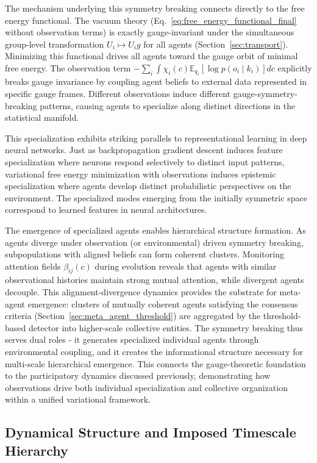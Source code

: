 \documentclass[11pt]{article}
\begin{document}
The mechanism underlying this symmetry breaking connects directly to the free energy functional. The vacuum theory (Eq.~\ref{eq:free_energy_functional_final} without observation terms) is exactly gauge-invariant under the simultaneous group-level transformation $U_i \mapsto U_i g$ for all agents (Section~\ref{sec:transport}). Minimizing this functional drives all agents toward the gauge orbit of minimal free energy. The observation term $-\sum_i \int \chi_i(c) \mathbb{E}_{q_i}[\log p(o_i \mid k_i)]  dc$ explicitly breaks gauge invariance by coupling agent beliefs to external data represented in specific gauge frames. Different observations induce different gauge-symmetry-breaking patterns, causing agents to specialize along distinct directions in the statistical manifold.

This specialization exhibits striking parallels to representational learning in deep neural networks. Just as backpropagation gradient descent induces feature specialization where neurons respond selectively to distinct input patterns, variational free energy minimization with observations induces epistemic specialization where agents develop distinct probabilistic perspectives on the environment. The specialized modes emerging from the initially symmetric space correspond to learned features in neural architectures.

The emergence of specialized agents enables hierarchical structure formation. As agents diverge under observation (or environmental) driven symmetry breaking, subpopulations with aligned beliefs can form coherent clusters. Monitoring attention fields $\beta_{ij}(c)$ during evolution reveals that agents with similar observational histories maintain strong mutual attention, while divergent agents decouple. This alignment-divergence dynamics provides the substrate for meta-agent emergence: clusters of mutually coherent agents satisfying the consensus criteria (Section~\ref{sec:meta_agent_threshold}) are aggregated by the threshold-based detector into higher-scale collective entities. The symmetry breaking thus serves dual roles - it generates specialized individual agents through environmental coupling, and it creates the informational structure necessary for multi-scale hierarchical emergence. This connects the gauge-theoretic foundation to the participatory dynamics discussed previously, demonstrating how observations drive both individual specialization and collective organization within a unified variational framework.

\subsection{Dynamical Structure and Imposed Timescale Hierarchy}
\end{document}
